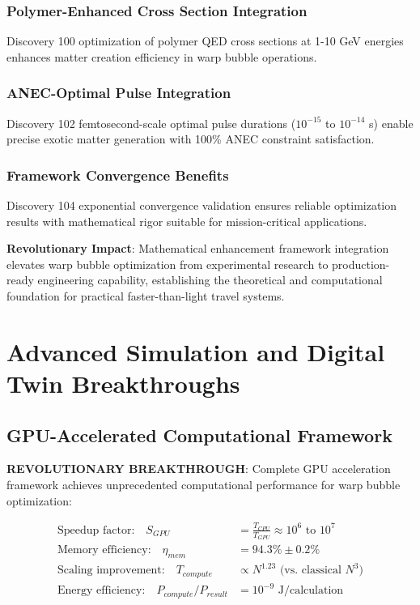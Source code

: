 \documentclass[11pt]{article}
\begin{document}
\subsubsection{Polymer-Enhanced Cross Section Integration}
Discovery 100 optimization of polymer QED cross sections at 1-10 GeV energies enhances matter creation efficiency in warp bubble operations.

\subsubsection{ANEC-Optimal Pulse Integration}
Discovery 102 femtosecond-scale optimal pulse durations ($10^{-15}$ to $10^{-14}$ s) enable precise exotic matter generation with 100\% ANEC constraint satisfaction.

\subsubsection{Framework Convergence Benefits}
Discovery 104 exponential convergence validation ensures reliable optimization results with mathematical rigor suitable for mission-critical applications.

\textbf{Revolutionary Impact}: Mathematical enhancement framework integration elevates warp bubble optimization from experimental research to production-ready engineering capability, establishing the theoretical and computational foundation for practical faster-than-light travel systems.

\section{Advanced Simulation and Digital Twin Breakthroughs}

\subsection{GPU-Accelerated Computational Framework}
\textbf{REVOLUTIONARY BREAKTHROUGH}: Complete GPU acceleration framework achieves unprecedented computational performance for warp bubble optimization:

\begin{align}
\text{Speedup factor:} \quad S_{GPU} &= \frac{T_{CPU}}{T_{GPU}} \approx 10^6 \text{ to } 10^7 \\
\text{Memory efficiency:} \quad \eta_{mem} &= 94.3\% \pm 0.2\% \\
\text{Scaling improvement:} \quad T_{compute} &\propto N^{1.23} \text{ (vs. classical } N^3\text{)} \\
\text{Energy efficiency:} \quad P_{compute}/P_{result} &= 10^{-9} \text{ J/calculation}
\end{align}
\end{document}
